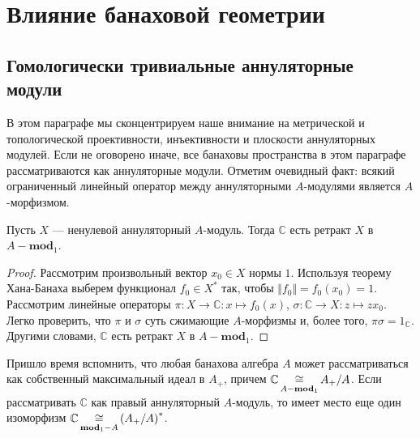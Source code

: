 
\section{Влияние банаховой геометрии}\label{SectionTheImpactOfBanachGeometry}



\subsection{
    Гомологически тривиальные аннуляторные модули
}\label{
    SubSectionHomoligicallyTrivialAnnihilatorModules
}

В этом параграфе мы сконцентрируем наше внимание на метрической и топологической
проективности, инъективности и плоскости аннуляторных модулей. Если не оговорено
иначе, все банаховы пространства в этом параграфе рассматриваются как
аннуляторные модули. Отметим очевидный факт: всякий ограниченный линейный
оператор между аннуляторными $A$-модулями является $A$-морфизмом.

\begin{proposition}\label{AnnihCModIsRetAnnihMod} Пусть $X$ --- ненулевой
аннуляторный $A$-модуль. Тогда $\mathbb{C}$ есть ретракт $X$ в
$A-\mathbf{mod}_1$.
\end{proposition}
\begin{proof} Рассмотрим произвольный вектор $x_0\in X$ нормы $1$. Используя
теорему Хана-Банаха выберем функционал $f_0\in X^*$ так, чтобы $\Vert
f_0\Vert=f_0(x_0)=1$. Рассмотрим линейные операторы $\pi:X\to
\mathbb{C}:x\mapsto f_0(x)$, $\sigma:\mathbb{C}\to X:z\mapsto zx_0$. Легко
проверить, что $\pi$ и $\sigma$ суть сжимающие $A$-морфизмы и, более того,
$\pi\sigma=1_\mathbb{C}$. Другими словами, $\mathbb{C}$ есть ретракт $X$ в
$A-\mathbf{mod}_1$.
\end{proof}

Пришло время вспомнить, что любая банахова алгебра $A$ может рассматриваться как
собственный максимальный идеал в $A_+$, причем
$\mathbb{C}\mathop{\mathbin{\cong}}\limits_{A-\mathbf{mod}_1} A_+/A$. Если рассматривать $\mathbb{C}$ как
правый аннуляторный $A$-модуль, то имеет место еще один изоморфизм
$\mathbb{C}\mathop{\mathbin{\cong}}\limits_{\mathbf{mod}_1-A}{(A_+/A)}^*$. 

